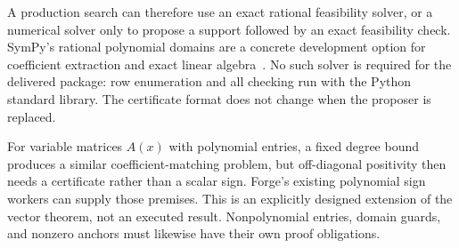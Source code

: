 A production search can therefore use an exact rational feasibility solver, or a numerical solver only to propose a support followed by an exact feasibility check. SymPy's rational polynomial domains are a concrete development option for coefficient extraction and exact linear algebra~\cite{sympy}. No such solver is required for the delivered package: row enumeration and all checking run with the Python standard library. The certificate format does not change when the proposer is replaced.

For variable matrices $A(x)$ with polynomial entries, a fixed degree bound produces a similar coefficient-matching problem, but off-diagonal positivity then needs a certificate rather than a scalar sign. Forge's existing polynomial sign workers can supply those premises. This is an explicitly designed extension of the vector theorem, not an executed result. Nonpolynomial entries, domain guards, and nonzero anchors must likewise have their own proof obligations.

